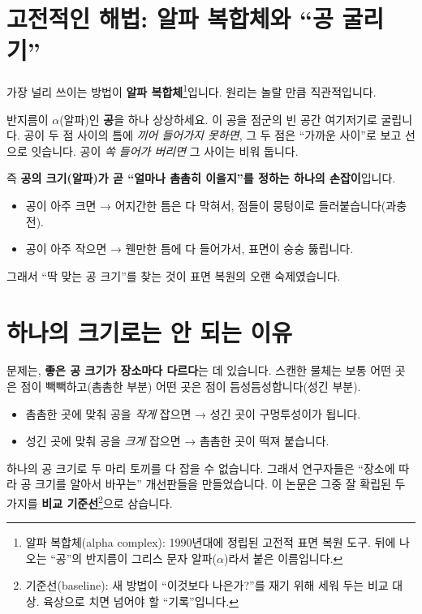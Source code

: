 \documentclass[11pt]{article}
\begin{document}
\section{고전적인 해법: 알파 복합체와 ``공 굴리기''}

가장 널리 쓰이는 방법이 \textbf{알파 복합체}\footnote{알파 복합체(alpha complex):
1990년대에 정립된 고전적 표면 복원 도구. 뒤에 나오는 ``공''의 반지름이 그리스 문자
알파($\alpha$)라서 붙은 이름입니다.}입니다. 원리는 놀랄 만큼 직관적입니다.

반지름이 $\alpha$(알파)인 \textbf{공}을 하나 상상하세요. 이 공을 점군의 빈 공간
여기저기로 굴립니다. 공이 두 점 사이의 틈에 \emph{끼어 들어가지 못하면}, 그 두 점은
``가까운 사이''로 보고 선으로 잇습니다. 공이 \emph{쏙 들어가 버리면} 그 사이는 비워 둡니다.

즉 \textbf{공의 크기(알파)가 곧 ``얼마나 촘촘히 이을지''를 정하는 하나의 손잡이}입니다.
\begin{itemize}[leftmargin=1.4em]
  \item 공이 아주 크면 → 어지간한 틈은 다 막혀서, 점들이 뭉텅이로 들러붙습니다(과충전).
  \item 공이 아주 작으면 → 웬만한 틈에 다 들어가서, 표면이 숭숭 뚫립니다.
\end{itemize}
그래서 ``딱 맞는 공 크기''를 찾는 것이 표면 복원의 오랜 숙제였습니다.

\section{하나의 크기로는 안 되는 이유}

문제는, \textbf{좋은 공 크기가 장소마다 다르다}는 데 있습니다. 스캔한 물체는 보통
어떤 곳은 점이 빽빽하고(촘촘한 부분) 어떤 곳은 점이 듬성듬성합니다(성긴 부분).
\begin{itemize}[leftmargin=1.4em]
  \item 촘촘한 곳에 맞춰 공을 \emph{작게} 잡으면 → 성긴 곳이 구멍투성이가 됩니다.
  \item 성긴 곳에 맞춰 공을 \emph{크게} 잡으면 → 촘촘한 곳이 떡져 붙습니다.
\end{itemize}
하나의 공 크기로 두 마리 토끼를 다 잡을 수 없습니다. 그래서 연구자들은 ``장소에 따라
공 크기를 알아서 바꾸는'' 개선판들을 만들었습니다. 이 논문은 그중 잘 확립된 두 가지를
\textbf{비교 기준선}\footnote{기준선(baseline): 새 방법이 ``이것보다 나은가?''를 재기
위해 세워 두는 비교 대상. 육상으로 치면 넘어야 할 ``기록''입니다.}으로 삼습니다.
\end{document}
